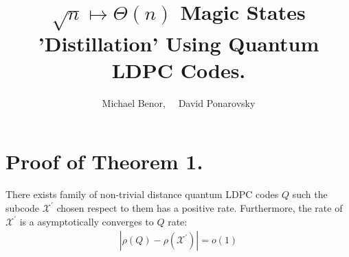 \documentclass[manuscript,screen,review]{acmart}
\begin{document}

\title{ $\sqrt{n} \mapsto \Theta(n)$  Magic States 'Distillation' Using
Quantum LDPC Codes. }
\author{Michael Benor, \ \ David Ponarovsky}
\maketitle

\newcommand*{\Mbas}{\mathcal{X}^\prime}
\newcommand*{\bas}{\mathcal{X}}
\newcommand*{\sMbas}{\Mbas}
\newcommand*{\QQ}{C_{X}/C_{Z}^\perp }
\newcommand*{\trig}{ Triorthogonal }
\newcommand*{\Hyp}{ Hyperproduct }
\newcommand*{\Cin}{ C_{\text{initial}} }
\newcommand*{\Ctan}{ C_{\text{Tan}} }




\section{Proof of Theorem 1.}
\begin{claim}
  \label{claim:notempty}
  There exists family of non-trivial distance quantum LDPC codes $Q$ such the subcode $\sMbas$ chosen respect to them has a positive rate. Furthermore, the rate of $\sMbas$ is a asymptotically converges to $Q$ rate:
  \begin{equation*}
    \begin{split}
      \left| \rho\left(Q\right) - \rho\left(\sMbas\right) \right| = o(1)
    \end{split}
  \end{equation*}
\end{claim}
\end{document}
